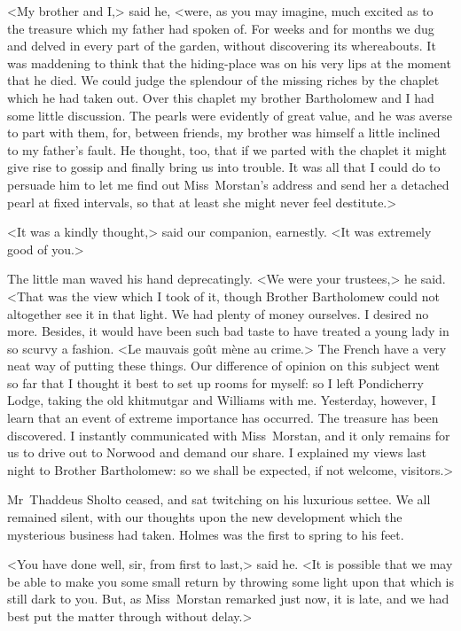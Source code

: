 <My brother and I,> said he, <were, as you may imagine, much excited as to the treasure which my father had spoken of. For weeks and for months we dug and delved in every part of the garden, without discovering its whereabouts. It was maddening to think that the hiding-place was on his very lips at the moment that he died. We could judge the splendour of the missing riches by the chaplet which he had taken out. Over this chaplet my brother Bartholomew and I had some little discussion. The pearls were evidently of great value, and he was averse to part with them, for, between friends, my brother was himself a little inclined to my father's fault. He thought, too, that if we parted with the chaplet it might give rise to gossip and finally bring us into trouble. It was all that I could do to persuade him to let me find out Miss~Morstan's address and send her a detached pearl at fixed intervals, so that at least she might never feel destitute.>

<It was a kindly thought,> said our companion, earnestly. <It was extremely good of you.>

The little man waved his hand deprecatingly. <We were your trustees,> he said. <That was the view which I took of it, though Brother Bartholomew could not altogether see it in that light. We had plenty of money ourselves. I desired no more. Besides, it would have been such bad taste to have treated a young lady in so scurvy a fashion. <\textfrench{Le mauvais goût mène au crime.}> The French have a very neat way of putting these things. Our difference of opinion on this subject went so far that I thought it best to set up rooms for myself: so I left Pondicherry Lodge, taking the old khitmutgar and Williams with me. Yesterday, however, I learn that an event of extreme importance has occurred. The treasure has been discovered. I instantly communicated with Miss~Morstan, and it only remains for us to drive out to Norwood and demand our share. I explained my views last night to Brother Bartholomew: so we shall be expected, if not welcome, visitors.>

Mr~Thaddeus Sholto ceased, and sat twitching on his luxurious settee. We all remained silent, with our thoughts upon the new development which the mysterious business had taken. Holmes was the first to spring to his feet.

<You have done well, sir, from first to last,> said he. <It is possible that we may be able to make you some small return by throwing some light upon that which is still dark to you. But, as Miss~Morstan remarked just now, it is late, and we had best put the matter through without delay.>

